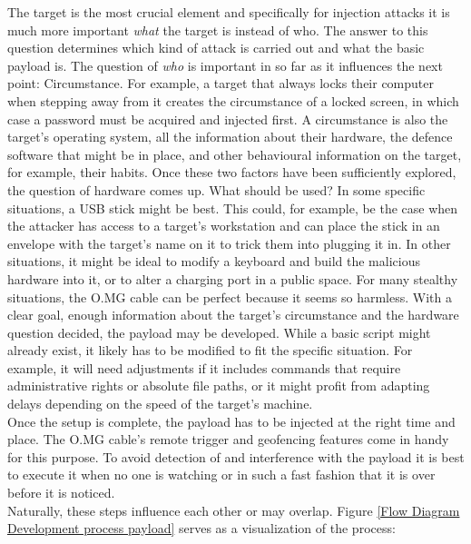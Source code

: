 The target is the most crucial element and specifically for injection attacks it is much more important \emph{what} the target is instead of who. The answer to this question determines which kind of attack is carried out and what the basic payload is. The question of \emph{who} is important in so far as it influences the next point: Circumstance. For example, a target that always locks their computer when stepping away from it creates the circumstance of a locked screen, in which case a password must be acquired and injected first. A circumstance is also the target's operating system, all the information about their hardware, the defence software that might be in place, and other behavioural information on the target, for example, their habits. Once these two factors have been sufficiently explored, the question of hardware comes up. What should be used? In some specific situations, a USB stick might be best. This could, for example, be the case when the attacker has access to a target's workstation and can place the stick in an envelope with the target's name on it to trick them into plugging it in. In other situations, it might be ideal to modify a keyboard and build the malicious hardware into it, or to alter a charging port in a public space. For many stealthy situations, the O.MG cable can be perfect because it seems so harmless. With a clear goal, enough information about the target's circumstance and the hardware question decided, the payload may be developed. While a basic script might already exist, it likely has to be modified to fit the specific situation. For example, it will need adjustments if it includes commands that require administrative rights or absolute file paths, or it might profit from adapting delays depending on the speed of the target's machine. \\
Once the setup is complete, the payload has to be injected at the right time and place. The O.MG cable's remote trigger and geofencing features come in handy for this purpose. To avoid detection of and interference with the payload it is best to execute it when no one is watching or in such a fast fashion that it is over before it is noticed.\\
Naturally, these steps influence each other or may overlap. Figure \ref{Flow Diagram Development process payload} serves as a visualization of the process:


